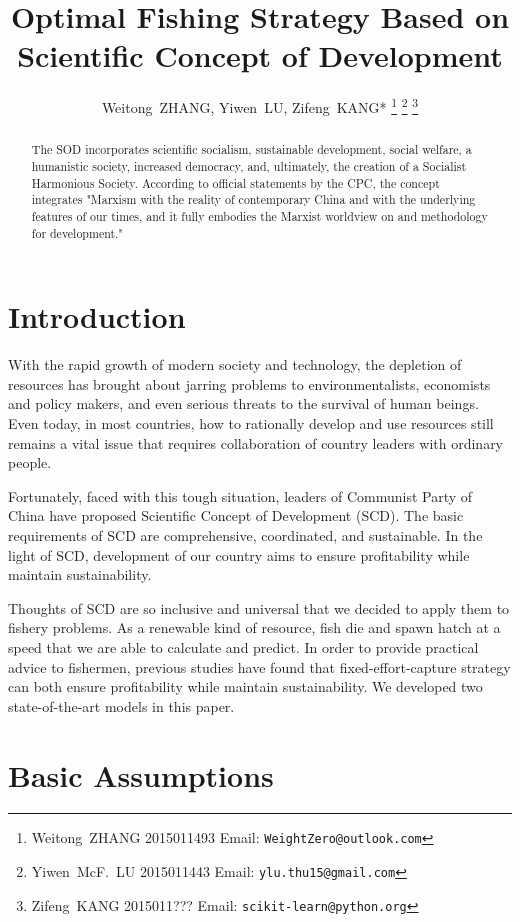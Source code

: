 \documentclass{IEEEtran}
\title{Optimal Fishing Strategy Based on Scientific Concept of Development}
\author{
    Weitong~ZHANG, Yiwen~LU, Zifeng~KANG*
    \thanks{Weitong~ZHANG 2015011493 Email: \texttt{WeightZero@outlook.com}}
    \thanks{Yiwen~McF.~LU 2015011443 Email: \texttt{ylu.thu15@gmail.com}}
    \thanks{Zifeng~KANG 2015011??? Email: \texttt{scikit-learn@python.org}}
}
\begin{document}
\maketitle

\begin{abstract}
    The SOD incorporates scientific socialism, sustainable development, social welfare, a humanistic society, increased democracy, and, ultimately, the creation of a Socialist Harmonious Society. According to official statements by the CPC, the concept integrates "Marxism with the reality of contemporary China and with the underlying features of our times, and it fully embodies the Marxist worldview on and methodology for development."
\end{abstract}

\section{Introduction}

With the rapid growth of modern society and technology, the depletion of resources has brought about jarring problems to environmentalists, economists and policy makers, and even serious threats to the survival of human beings. Even today, in most countries, how to rationally develop and use resources still remains a vital issue that requires collaboration of country leaders with ordinary people.

Fortunately, faced with this tough situation, leaders of Communist Party of China have proposed Scientific Concept of Development (SCD). The basic requirements of SCD are comprehensive, coordinated, and sustainable. In the light of SCD, development of our country aims to ensure profitability while maintain sustainability.

Thoughts of SCD are so inclusive and universal that we decided to apply them to fishery problems. As a renewable kind of resource, fish die and spawn hatch at a speed that we are able to calculate and predict. In order to provide practical advice to fishermen, previous studies have found that fixed-effort-capture strategy can both ensure profitability while maintain sustainability. We developed two state-of-the-art models in this paper.

\section{Basic Assumptions}
\end{document}
